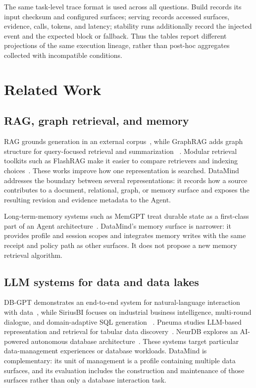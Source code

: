 The same task-level trace format is used across all questions. Build records
its input checksum and configured surfaces; serving records accessed surfaces,
evidence, calls, tokens, and latency; stability runs additionally record the
injected event and the expected block or fallback. Thus the tables
report different projections of the same execution lineage, rather than
post-hoc aggregates collected with incompatible conditions.

\section{Related Work}
\label{sec:related}

\subsection{RAG, graph retrieval, and memory}
\label{sec:related-retrieval}

RAG grounds generation in an external corpus~\cite{lewis2020rag}, while
GraphRAG adds graph structure for query-focused retrieval and summarization
~\cite{edge2024graphrag}. Modular retrieval toolkits such as FlashRAG make it
easier to compare retrievers and indexing choices~\cite{jin2025flashrag}. These
works improve how one representation is searched. DataMind addresses the
boundary between several representations: it records how a source contributes
to a document, relational, graph, or memory surface and exposes the resulting
revision and evidence metadata to the Agent.

Long-term-memory systems such as MemGPT treat durable state as a first-class
part of an Agent architecture~\cite{packer2023memgpt}. DataMind's memory
surface is narrower: it provides profile and session scopes and integrates
memory writes with the same receipt and policy path as other surfaces. It does
not propose a new memory retrieval algorithm.

\subsection{LLM systems for data and data lakes}
\label{sec:related-data-agents}

DB-GPT demonstrates an end-to-end system for natural-language interaction with
data~\cite{xue2024dbgpt}, while SiriusBI focuses on industrial business
intelligence, multi-round dialogue, and domain-adaptive SQL generation
~\cite{jiang2025siriusbi}. Pneuma studies LLM-based representation and
retrieval for tabular data discovery~\cite{balaka2025pneuma}. NeurDB explores
an AI-powered autonomous database architecture~\cite{zhao2025neurdb}. These
systems target particular data-management experiences or database workloads.
DataMind is complementary: its unit of management is a profile containing
multiple data surfaces, and its evaluation includes the construction and
maintenance of those surfaces rather than only a database interaction task.

